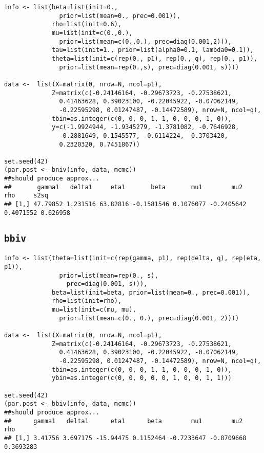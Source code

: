 \documentclass[12pt,oneside]{article}
\begin{document}
\begin{verbatim}
info <- list(beta=list(init=0.,
               prior=list(mean=0., prec=0.001)),
             rho=list(init=0.6),
             mu=list(init=c(0.,0.),
               prior=list(mean=c(0.,0.), prec=diag(0.001,2))),
             tau=list(init=1., prior=list(alpha0=0.1, lambda0=0.1)),
             theta=list(init=c(rep(0., p1), rep(0., q), rep(0., p1)),
               prior=list(mean=rep(0.,s), prec=diag(0.001, s))))

data <-  list(X=matrix(0, nrow=N, ncol=p1),
             Z=matrix(c(-0.24146164, -0.29673723, -0.27538621,
               0.41463628, 0.39023100, -0.22045922, -0.07062149,
               -0.22595298, 0.01247487, -0.14472589), nrow=N, ncol=q),
             tbin=as.integer(c(0, 0, 0, 1, 1, 0, 0, 0, 1, 0)),
             y=c(-1.9924944, -1.9345279, -1.3781082, -0.7646928,
               -0.2881649, 0.1545577, -0.6114224, -0.3703420,
               0.2320320, 0.7451867))

set.seed(42)
(par.post <- bniv(info, data, mcmc))
##should produce approx...
##       gamma1   delta1     eta1       beta       mu1        mu2       rho     s2sq
## [1,] 47.79852 1.231516 63.82816 -0.1581546 0.1076077 -0.2405642 0.4071552 0.626958
\end{verbatim}

\subsection{\texttt{bbiv}}

\begin{verbatim}
info <- list(theta=list(init=c(rep(gamma, p1), rep(delta, q), rep(eta, p1)),
               prior=list(mean=rep(0., s),
                 prec=diag(0.001, s))),
             beta=list(init=beta, prior=list(mean=0., prec=0.001)),
             rho=list(init=rho),
             mu=list(init=c(mu, mu),
               prior=list(mean=c(0., 0.), prec=diag(0.001, 2))))

data <-  list(X=matrix(0, nrow=N, ncol=p1),
             Z=matrix(c(-0.24146164, -0.29673723, -0.27538621,
               0.41463628, 0.39023100, -0.22045922, -0.07062149,
               -0.22595298, 0.01247487, -0.14472589), nrow=N, ncol=q),
             tbin=as.integer(c(0, 0, 0, 1, 1, 0, 0, 0, 1, 0)),
             ybin=as.integer(c(0, 0, 0, 0, 0, 1, 0, 0, 1, 1)))

set.seed(42)
(par.post <- bbiv(info, data, mcmc))
##should produce approx...
##      gamma1   delta1      eta1      beta        mu1        mu2       rho
## [1,] 3.41756 3.697175 -15.94475 0.1152464 -0.7233647 -0.8709668 0.3693283
\end{verbatim}
\end{document}
